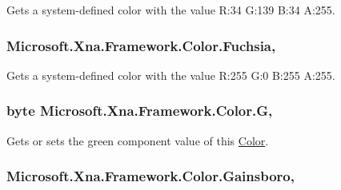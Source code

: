 Gets a system-\/defined color with the value R\+:34 G\+:139 B\+:34 A\+:255.

\hypertarget{struct_microsoft_1_1_xna_1_1_framework_1_1_color_a6ec6b57a97fb16a13982751b05df8079}{}
\subsubsection[{Fuchsia}]{ Microsoft.\+Xna.\+Framework.\+Color.\+Fuchsia\hspace{0.3cm}{\ttfamily [static]}, {\ttfamily [get]}}\label{struct_microsoft_1_1_xna_1_1_framework_1_1_color_a6ec6b57a97fb16a13982751b05df8079}


Gets a system-\/defined color with the value R\+:255 G\+:0 B\+:255 A\+:255.

\hypertarget{struct_microsoft_1_1_xna_1_1_framework_1_1_color_aee37e15ba109bc57b629b03c734a5a1e}{}
\subsubsection[{G}]{\setlength{\rightskip}{0pt plus 5cm}byte Microsoft.\+Xna.\+Framework.\+Color.\+G\hspace{0.3cm}{\ttfamily [get]}, {\ttfamily [set]}}\label{struct_microsoft_1_1_xna_1_1_framework_1_1_color_aee37e15ba109bc57b629b03c734a5a1e}


Gets or sets the green component value of this \hyperlink{struct_microsoft_1_1_xna_1_1_framework_1_1_color}{Color}.

\hypertarget{struct_microsoft_1_1_xna_1_1_framework_1_1_color_a257bfb3afd7fd7072d957a7c76b09114}{}
\subsubsection[{Gainsboro}]{ Microsoft.\+Xna.\+Framework.\+Color.\+Gainsboro\hspace{0.3cm}{\ttfamily [static]}, {\ttfamily [get]}}\label{struct_microsoft_1_1_xna_1_1_framework_1_1_color_a257bfb3afd7fd7072d957a7c76b09114}


